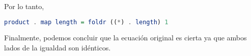 \documentclass[letterpaper,11pt]{article}
\begin{document}
\begin{enumerate}
\begin{itemize}
        Por lo tanto,
        \begin{lstlisting}[language=Haskell]
            product . map length = foldr ((*) . length) 1
        \end{lstlisting}
        
        Finalmente, podemos concluir que la ecuación original es cierta ya que 
        ambos lados de la igualdad son idénticos.
        
    \end{itemize}  
\end{enumerate}
\end{document}

